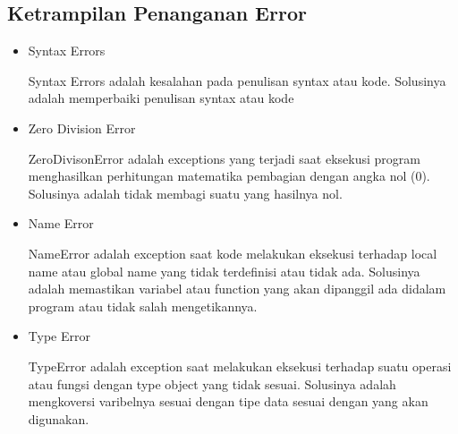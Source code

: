 \subsection{Ketrampilan Penanganan Error}
\begin{itemize}
\item Syntax Errors

Syntax Errors adalah kesalahan pada penulisan syntax atau kode. Solusinya adalah memperbaiki penulisan syntax atau kode

\item Zero Division Error

ZeroDivisonError adalah exceptions yang terjadi saat eksekusi program menghasilkan perhitungan matematika pembagian dengan angka nol (0). Solusinya adalah tidak membagi suatu yang hasilnya nol.

\item Name Error

NameError adalah exception saat kode melakukan eksekusi terhadap local name atau global name yang tidak terdefinisi atau tidak ada. Solusinya adalah memastikan variabel atau function yang akan dipanggil ada didalam program atau tidak salah mengetikannya.

\item Type Error

TypeError adalah exception saat melakukan eksekusi terhadap suatu operasi atau fungsi dengan type object yang tidak sesuai. Solusinya adalah mengkoversi varibelnya sesuai dengan tipe data sesuai dengan yang akan digunakan.
\end{itemize}





